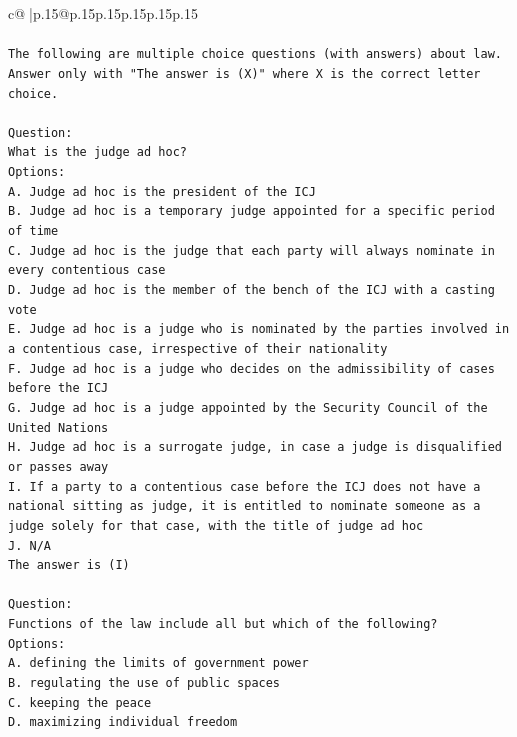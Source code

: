 \documentclass{article}
\begin{document}
{\begin{supertabular}{c@{$\;$}|p{.15\linewidth}@{}p{.15\linewidth}p{.15\linewidth}p{.15\linewidth}p{.15\linewidth}p{.15\linewidth}}
{{{\\ 
\\ 
\texttt{The following are multiple choice questions (with answers) about law. Answer only with "The answer is (X)" where X is the correct letter choice.} \\
\\ 
\texttt{Question:} \\
\texttt{What is the judge ad hoc?} \\
\texttt{Options:} \\
\texttt{A. Judge ad hoc is the president of the ICJ} \\
\texttt{B. Judge ad hoc is a temporary judge appointed for a specific period of time} \\
\texttt{C. Judge ad hoc is the judge that each party will always nominate in every contentious case} \\
\texttt{D. Judge ad hoc is the member of the bench of the ICJ with a casting vote} \\
\texttt{E. Judge ad hoc is a judge who is nominated by the parties involved in a contentious case, irrespective of their nationality} \\
\texttt{F. Judge ad hoc is a judge who decides on the admissibility of cases before the ICJ} \\
\texttt{G. Judge ad hoc is a judge appointed by the Security Council of the United Nations} \\
\texttt{H. Judge ad hoc is a surrogate judge, in case a judge is disqualified or passes away} \\
\texttt{I. If a party to a contentious case before the ICJ does not have a national sitting as judge, it is entitled to nominate someone as a judge solely for that case, with the title of judge ad hoc} \\
\texttt{J. N/A} \\
\texttt{The answer is (I)} \\
\\ 
\texttt{Question:} \\
\texttt{Functions of the law include all but which of the following?} \\
\texttt{Options:} \\
\texttt{A. defining the limits of government power} \\
\texttt{B. regulating the use of public spaces} \\
\texttt{C. keeping the peace} \\
\texttt{D. maximizing individual freedom} \\
}}}
\end{supertabular}}
\end{document}
